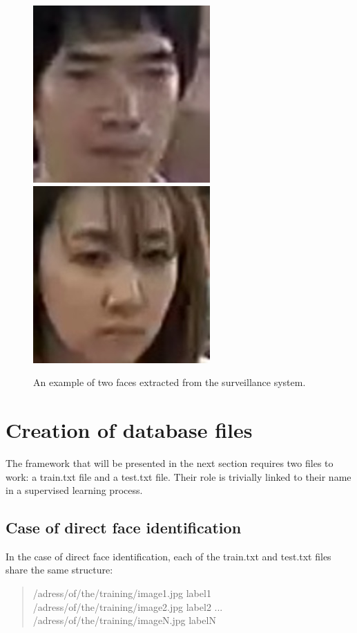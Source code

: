 \begin{figure}[!ht]
  \centering
  \includegraphics[scale=0.7]{figures/face1.jpg}
  \includegraphics[scale=0.7]{figures/face2.jpg}
  \caption[An example of two faces extracted from the surveillance system.]{An example of two faces extracted from the surveillance system.}
  \label{fig:face}
\end{figure}

\section{Creation of database files}

The framework that will be presented in the next section requires two files to work: a train.txt file and a test.txt file. Their role is trivially linked to their name in a supervised learning process.

\subsection{Case of direct face identification}
 In the case of direct face identification, each of the train.txt and test.txt files share the same structure:

\blockquote{/adress/of/the/training/image1.jpg label1\newline
/adress/of/the/training/image2.jpg label2\newline
...\newline
/adress/of/the/training/imageN.jpg labelN}


